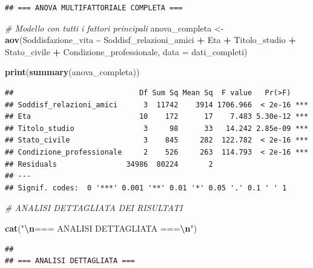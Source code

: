 \documentclass[
]{article}
\newenvironment{Shaded}{\begin{snugshade}}{\end{snugshade}}
\newcommand{\AttributeTok}[1]{\textcolor[rgb]{0.13,0.29,0.53}{#1}}
\newcommand{\CommentTok}[1]{\textcolor[rgb]{0.56,0.35,0.01}{\textit{#1}}}
\newcommand{\FunctionTok}[1]{\textcolor[rgb]{0.13,0.29,0.53}{\textbf{#1}}}
\newcommand{\NormalTok}[1]{#1}
\newcommand{\OtherTok}[1]{\textcolor[rgb]{0.56,0.35,0.01}{#1}}
\newcommand{\SpecialCharTok}[1]{\textcolor[rgb]{0.81,0.36,0.00}{\textbf{#1}}}
\newcommand{\StringTok}[1]{\textcolor[rgb]{0.31,0.60,0.02}{#1}}
\begin{document}
\begin{verbatim}
## === ANOVA MULTIFATTORIALE COMPLETA ===
\end{verbatim}

\begin{Shaded}
\begin{Highlighting}[]
\CommentTok{\# Modello con tutti i fattori principali}
\NormalTok{anova\_completa }\OtherTok{\textless{}{-}} \FunctionTok{aov}\NormalTok{(Soddisfazione\_vita }\SpecialCharTok{\textasciitilde{}}\NormalTok{ Soddisf\_relazioni\_amici }\SpecialCharTok{+} 
\NormalTok{                                          Eta }\SpecialCharTok{+} 
\NormalTok{                                          Titolo\_studio }\SpecialCharTok{+} 
\NormalTok{                                          Stato\_civile }\SpecialCharTok{+} 
\NormalTok{                                          Condizione\_professionale, }
                      \AttributeTok{data =}\NormalTok{ dati\_completi)}

\FunctionTok{print}\NormalTok{(}\FunctionTok{summary}\NormalTok{(anova\_completa))}
\end{Highlighting}
\end{Shaded}

\begin{verbatim}
##                             Df Sum Sq Mean Sq  F value   Pr(>F)    
## Soddisf_relazioni_amici      3  11742    3914 1706.966  < 2e-16 ***
## Eta                         10    172      17    7.483 5.30e-12 ***
## Titolo_studio                3     98      33   14.242 2.85e-09 ***
## Stato_civile                 3    845     282  122.782  < 2e-16 ***
## Condizione_professionale     2    526     263  114.793  < 2e-16 ***
## Residuals                34986  80224       2                      
## ---
## Signif. codes:  0 '***' 0.001 '**' 0.01 '*' 0.05 '.' 0.1 ' ' 1
\end{verbatim}

\begin{Shaded}
\begin{Highlighting}[]
\CommentTok{\# ANALISI DETTAGLIATA DEI RISULTATI}

\FunctionTok{cat}\NormalTok{(}\StringTok{"}\SpecialCharTok{\textbackslash{}n}\StringTok{=== ANALISI DETTAGLIATA ===}\SpecialCharTok{\textbackslash{}n}\StringTok{"}\NormalTok{)}
\end{Highlighting}
\end{Shaded}

\begin{verbatim}
## 
## === ANALISI DETTAGLIATA ===
\end{verbatim}
\end{document}

